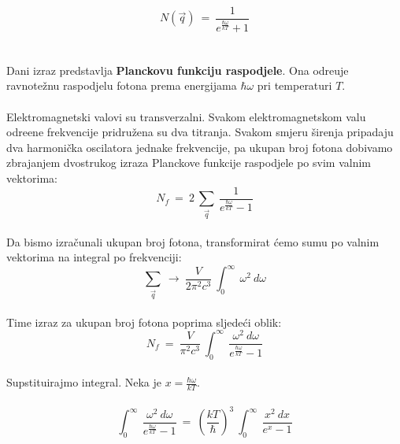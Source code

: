 \documentclass[a4paper,12pt]{article}
\begin{document}
$$ N(\vec{q})\ =\ \frac{1}{e^{\frac{\hbar\omega}{kT}}+1} $$
\\
\\
Dani izraz predstavlja \textbf{Planckovu funkciju raspodjele}. Ona odre\dj uje ravnote\v{z}nu raspodjelu fotona prema energijama $\hbar\omega$ pri temperaturi $T$.
\\
\\
Elektromagnetski valovi su transverzalni. Svakom elektromagnetskom valu odre\dj ene frekvencije pridru\v{z}ena su dva titranja. 
Svakom smjeru \v{s}irenja pripadaju dva harmoni\v{c}ka oscilatora jednake frekvencije, pa ukupan broj fotona dobivamo zbrajanjem dvostrukog izraza Planckove funkcije raspodjele 
po svim valnim vektorima:
\\
$$ N_f\ =\ 2\ \sum_{\vec{q}}\ \frac{1}{e^{\frac{\hbar\omega}{kT}}-1}  $$
\\
Da bismo izra\v{c}unali ukupan broj fotona, transformirat \'cemo sumu po valnim vektorima na integral po frekvenciji:
$$ \sum_{\vec{q}}\ \rightarrow\ \frac{V}{2 \pi^2 c^3}\ \int_{0}^{\infty}\ \omega^2\ d\omega $$
\\
Time izraz za ukupan broj fotona poprima sljede\'ci oblik:
\\
$$ N_f\ =\ \frac{V}{\pi^2 c^3}\ \int_{0}^{\infty}\ \frac{\omega^2\ d\omega}{e^{\frac{\hbar\omega}{kT}}-1} $$
\\
Supstituirajmo integral. Neka je $x=\frac{\hbar\omega}{kT}$. 
\\
\\
$$ \int_{0}^{\infty}\ \frac{\omega^2\ d\omega}{e^{\frac{\hbar\omega}{kT}}-1}\ =\ \left( \frac{kT}{\hbar} \right)^3\ \int_{0}^{\infty}\ \frac{x^2\ dx}{e^x-1} $$
\end{document}

